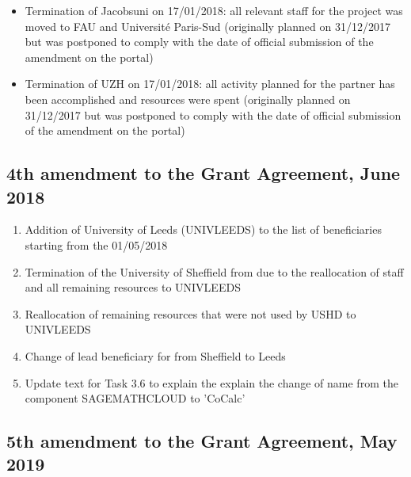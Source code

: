 \begin{enumerate}
\begin{itemize}
  \item Termination of Jacobsuni on 17/01/2018: all relevant staff for the project was moved to FAU and Université Paris-Sud (originally planned on 31/12/2017 but was postponed to comply with the date of official submission of the amendment on the portal)
  \item Termination of UZH on 17/01/2018: all activity planned for the partner has been accomplished and resources were spent (originally planned on 31/12/2017 but was postponed to comply with the date of official submission of the amendment on the portal)
  \end{itemize}
\end{enumerate}
\clearpage

\thispagestyle{empty}
\subsection*{4th amendment to the Grant Agreement, June 2018}

\begin{enumerate}
\item Addition of University of Leeds (UNIVLEEDS) to the list of beneficiaries starting from the 01/05/2018
\item Termination of the University of Sheffield from \TheProject due to the reallocation of staff and all remaining resources to UNIVLEEDS
\item Reallocation of remaining resources that were not used by USHD to UNIVLEEDS
\item Change of lead beneficiary for  from Sheffield to Leeds
\item Update text for Task 3.6 to explain the explain the change of name from the component SAGEMATHCLOUD to 'CoCalc'
\end{enumerate}

\clearpage
\setcounter{page}{1}

\thispagestyle{empty}
\subsection*{5th amendment to the Grant Agreement, May 2019}


